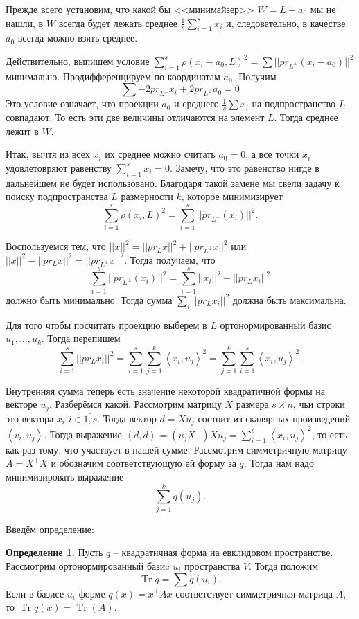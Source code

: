 \documentclass[10pt,a4paper,oneside]{book}
\theoremstyle{definition}
\newtheorem{defn}{Определение}
\newcommand{\ovl}{\overline}
\newcommand{\Tr}{\operatorname{Tr}}
\def\lan{\left\langle }
\def\ran{\right\rangle}
\def\dfn{\begin{defn}}
\def\edfn{\end{defn}}
\begin{document}
Прежде всего установим, что какой бы <<минимайзер>> $W=L+a_0$ мы не нашли, в $W$ всегда будет лежать среднее $\frac{1}{s}\sum_{i=1}^s x_i$ и, следовательно, в качестве $a_0$ всегда можно взять среднее.

Действительно, выпишем условие $\sum_{i=1}^s \rho(x_i-a_0, L)^2=\sum ||pr_{L^{\bot}} (x_i-a_0)||^2$  минимально.  Продифференцируем по координатам $a_0$. Получим $$\sum -2pr_{L^{\bot}} x_i + 2 pr_{L^{\bot}} a_0=0$$
 Это условие означает, что проекции $a_0$ и среднего $\frac{1}{s}\sum x_i$ на подпространство $L$ совпадают. То есть эти две величины отличаются на элемент $L$. Тогда среднее лежит в $W$. 

Итак, вычтя из всех $x_i$ их среднее можно считать $a_0=0$, а все точки $x_i$ удовлетовряют равенству $\sum_{i=1}^s x_i=0$. Замечу, что это равенство нигде в дальнейшем не будет использовано. Благодаря такой замене мы свели задачу к поиску подпространства $L$ размерности $k$, которое минимизирует 
$$\sum_{i=1}^s \rho(x_i, L)^2=\sum_{i=1}^s ||pr_{L^{\bot}} (x_i)||^2.$$

Воспользуемся тем, что $||x||^2=||pr_L x||^2+||pr_{L^{\bot}} x||^2$ или $||x||^2-||pr_L x||^2=||pr_{L^{\bot}} x||^2$. Тогда получаем, что
$$\sum_{i=1}^s ||pr_{L^{\bot}}(x_i)||^2=\sum_{i=1}^s ||x_i||^2-||pr_L x_i||^2$$
должно быть минимально. Тогда сумма $\sum_i ||pr_L x_i||^2$ должна быть максимальна.


Для того чтобы посчитать проекцию выберем в $L$ ортонормированный базис $u_1,\dots,u_k$. Тогда перепишем
$$\sum_{i=1}^s ||pr_L x_i||^2=\sum_{i=1}^s\sum_{j=1}^k \lan x_i,u_j\ran^2=\sum_{j=1}^k \sum_{i=1}^s \lan x_i,u_j\ran^2.$$

Внутренняя сумма теперь есть значение некоторой квадратичной формы на векторе $u_j$. Разберёмся какой. Рассмотрим матрицу $X$ размера $s\times n$, чьи строки это  вектора $x_i$ $i\in\ovl{1,s}$. Тогда вектор $d=Xu_j$ состоит из скалярных произведений  $\lan v_i, u_j\ran$. Тогда выражение $\lan d,d\ran = (u_jX^{\top})Xu_j = \sum_{i=1}^s \lan x_i,u_j\ran^2$, то есть как раз тому, что участвует в нашей сумме. Рассмотрим симметричную матрицу $A=X^{\top}X$ и обозначим соответствующую ей форму за $q$. Тогда нам надо минимизировать выражение
$$\sum_{j=1}^k q(u_j).$$

Введём определение:
\dfn
Пусть $q$ -- квадратичная форма на евклидовом пространстве. Рассмотрим ортонормированный базиc $u_i$ пространства $V$. Тогда положим 
$$\Tr q= \sum q(u_i).$$ Если в базисе $u_i$ форме $q(x)=x^{\top} Ax $ соответствует симметричная матрица $A$, то $\Tr q(x)=\Tr(A)$.
\edfn
\end{document}
